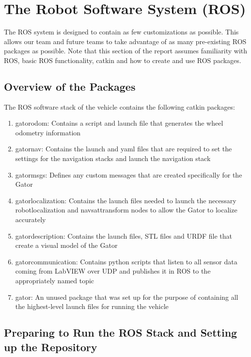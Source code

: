 \chapter{The Robot Software System (ROS)}

The ROS system is designed to contain as few customizations as possible. This allows our team and future teams to take advantage of as many pre-existing ROS packages as possible. Note that this section of the report assumes familiarity with ROS, basic ROS functionality, catkin and how to create and use ROS packages.

\section{Overview of the Packages}
The ROS software stack of the vehicle contains the following catkin packages: 

\begin{enumerate}
\item gator\textunderscore odom: Contains a script and launch file that generates the wheel odometry information
\item gator\textunderscore nav: Contains the launch and yaml files that are required to set the settings for the navigation stacks and launch the navigation stack
\item gator\textunderscore msgs: Defines any custom messages that are created specifically for the Gator
\item gator\textunderscore localization: Contains the launch files needed to launch the necessary robot\textunderscore localization and navsat\textunderscore transform nodes to allow the Gator to localize accurately
\item gator\textunderscore description: Contains the launch files, STL files and URDF file that create a visual model of the Gator
\item gator\textunderscore communication: Contains python scripts that listen to all sensor data coming from LabVIEW over UDP and publishes it in ROS to the appropriately named topic
\item gator: An unused package that was set up for the purpose of containing all the highest-level launch files for running the vehicle
\end{enumerate}

\section{Preparing to Run the ROS Stack and Setting up the Repository}

